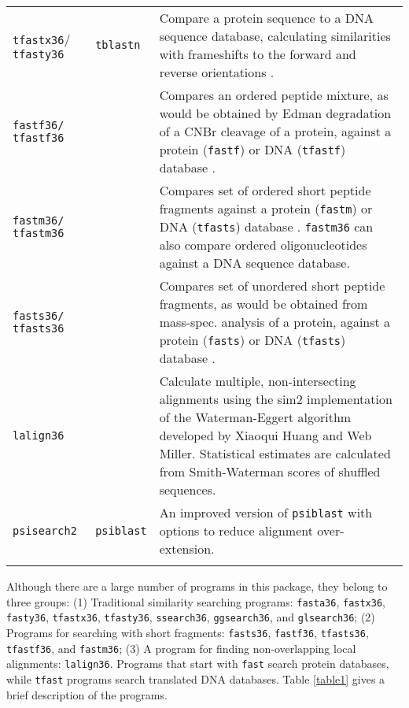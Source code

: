 \documentclass[11pt]{article}
\begin{document}
\begin{table}
\begin{tabular}{ p{0.8in} p{0.6in} p{4.6 in}}
\texttt{tfastx36}/ \texttt{tfasty36}& \texttt{tblastn} &
Compare a protein sequence to a DNA sequence
database, calculating similarities with frameshifts to the forward and
reverse orientations  \cite{wrp971}.\\[1 ex]

\texttt{fastf36/ tfastf36} &  &
Compares an ordered peptide mixture, as would be obtained by
Edman degradation of a CNBr cleavage of a protein, against a protein
(\texttt{fastf}) or DNA (\texttt{tfastf}) database \cite{wrp021}.\\[1 ex]

\texttt{fastm36/ tfastm36} &  &
Compares set of ordered short peptide fragments against a protein
(\texttt{fastm}) or DNA (\texttt{tfasts}) database
\cite{wrp021}. \texttt{fastm36} can also compare ordered
oligonucleotides against a DNA sequence database.\\[1 ex]

\texttt{fasts36/ tfasts36} &  &
Compares set of unordered short peptide fragments, as would be obtained
from mass-spec. analysis of a protein, against a
protein (\texttt{fasts}) or DNA (\texttt{tfasts}) database \cite{wrp021}.\\[1 ex]

\texttt{lalign36} & & Calculate multiple, non-intersecting alignments
using the sim2 implementation of the Waterman-Eggert
algorithm\cite{wat875} developed by Xiaoqui Huang and Web
Miller\cite{mil908}.  Statistical estimates are calculated from
Smith-Waterman scores of shuffled sequences. \\[1 ex]

\texttt{psisearch2} & \texttt{psiblast} & An improved version of \texttt{psiblast} with options to reduce alignment over-extension.\cite{wrp103,wrp171}\\[1 ex]

\hline \\
\end{tabular}
\end{table}

Although there are a large number of programs in this package, they
belong to three groups: (1) Traditional similarity searching programs:
\texttt{fasta36}, \texttt{fastx36}, \texttt{fasty36},
\texttt{tfastx36}, \texttt{tfasty36}, \texttt{ssearch36},
\texttt{ggsearch36}, and \texttt{glsearch36}; (2) Programs for
searching with short fragments: \texttt{fasts36}, \texttt{fastf36},
\texttt{tfasts36}, \texttt{tfastf36}, and \texttt{fastm36}; (3) A
program for finding non-overlapping local alignments: \texttt{lalign36}.
Programs that start with \texttt{fast} search protein databases, while
\texttt{tfast} programs search translated DNA databases.  Table \ref{table1}
gives a brief description of the programs.
\end{document}
